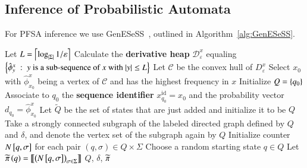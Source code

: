 \documentclass[9pt,journal,compsoc]{IEEEtran}
\begin{document}
{   \subsection{Inference of Probabilistic Automata}
   For PFSA inference we use  \textsf{GenESeSS}~\cite{chattopadhyay2013abductive}, outlined in Algorithm~\ref{alg:GenESeSS}.
\begin{algorithm}[!ht]
  \small
  Let $L=\left\lceil{\log_{\left| \Sigma \right|}1/\varepsilon}\right\rceil$\; \label{algline:GenL}
  Calculate the \textbf{derivative heap} $\mathcal{D}^{x}_{\varepsilon}$ equaling $\set{\hat{\phi}^{x}_y\ :\ \textrm{$y$ is a sub-sequence of $x$ with } |y|\leq L}$\;
  Let $\mathcal{C}$ be the convex hull of $D^{x}_{\varepsilon}$\; \label{algline:GenConv}
  Select $x_0$ with $\hat{\phi}^{x}_{x_0}$ being a vertex of $\mathcal{C}$ and has the highest frequency in $x$\; \label{algline:GenSyncSeq}
  Initialize $Q = \left\{ q_0 \right\}$\; \label{algline:GenStep2Start}
  Associate to $q_0$ the \textbf{sequence identifier} $x^{\textrm{id}}_{q_0} = x_0$ and the probability vector $d_{q_0} = \hat{\phi}^x_{x_0}$\;
  Let $\widetilde{Q}$ be the set of states that are just added and initialize it to be $Q$\;
  Take a strongly connected subgraph of the labeled directed graph defined by $Q$ and $\delta$, and denote the vertex set of the subgraph again by $Q$\;\label{algline:GenStep2End}
  Initialize counter $N\left[ q,\sigma \right]$ for each pair $(q, \sigma) \in Q\times\Sigma$\; \label{algline:GenIdenTransProbStart}
  Choose a random starting state $q\in Q$\;
  Let $\widetilde{\pi}\left( q \right) = \left\llbracket{\left( N\left[ q,\sigma \right] \right)_{\sigma\in\Sigma}}\right\rrbracket$\;\label{algline:GenIdenTransProbEnd}
  \Return $Q$, $\delta$, $\widetilde{\pi}$\;
  \caption{\algo}
  \label{alg:GenESeSS}
\end{algorithm}
}
\end{document}
